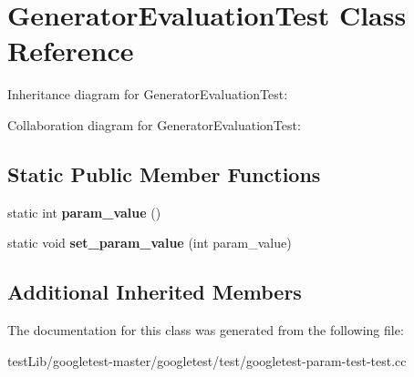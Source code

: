 \hypertarget{classGeneratorEvaluationTest}{}\section{Generator\+Evaluation\+Test Class Reference}
\label{classGeneratorEvaluationTest}


Inheritance diagram for Generator\+Evaluation\+Test\+:


Collaboration diagram for Generator\+Evaluation\+Test\+:
\subsection*{Static Public Member Functions}
\begin{DoxyCompactItemize}
\item 
\mbox{\label{classGeneratorEvaluationTest_ac819769e32b738677401424deb3c8cbe}} 
static int {\bfseries param\+\_\+value} ()
\item 
\mbox{\label{classGeneratorEvaluationTest_ae4f5fb96577dd680d9fa1fd6c3c4af46}} 
static void {\bfseries set\+\_\+param\+\_\+value} (int param\+\_\+value)
\end{DoxyCompactItemize}
\subsection*{Additional Inherited Members}


The documentation for this class was generated from the following file\+:\begin{DoxyCompactItemize}
\item 
test\+Lib/googletest-\/master/googletest/test/googletest-\/param-\/test-\/test.\+cc\end{DoxyCompactItemize}
